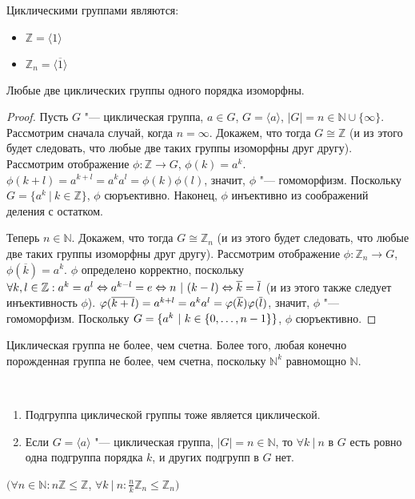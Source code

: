 \begin{example}
	Циклическими группами являются:
	\begin{itemize}
		\item $\mathbb{Z} = \langle 1 \rangle$
		\item $\mathbb{Z}_n = \langle \overline{1} \rangle$
	\end{itemize}
\end{example}

\begin{theorem}
	Любые две циклических группы одного порядка изоморфны.
\end{theorem}

\begin{proof}
	Пусть $G$ "--- циклическая группа, $a \in G$, $G = \langle a\rangle$, $|G| = n \in \mathbb{N}\cup\{\infty\}$. Рассмотрим сначала случай, когда $n = \infty$. Докажем, что тогда $G \cong \mathbb{Z}$ (и из этого будет следовать, что любые две таких группы изоморфны друг другу). Рассмотрим отображение $\phi: \mathbb{Z} \rightarrow G$, $\phi(k) = a^k$. $\phi(k + l) = a^{k + l} = a^ka^l = \phi(k)\phi(l)$, значит, $\phi$ "--- гомоморфизм. Поскольку $G = \{a^k~|~k \in \mathbb{Z}\}$, $\phi$ сюръективно. Наконец, $\phi$ инъективно из соображений деления с остатком.
	
	Теперь $n \in \mathbb{N}$. Докажем, что тогда $G \cong \mathbb{Z}_n$ (и из этого будет следовать, что любые две таких группы изоморфны друг другу). Рассмотрим отображение $\phi: \mathbb{Z}_n \rightarrow G$, $\phi(\overline{k}) = a^k$. $\phi$ определено корректно, поскольку $\forall k, l \in \mathbb{Z}: a^k = a^l \Leftrightarrow a^{k - l} = e \Leftrightarrow n~|~(k - l) \hm{\Leftrightarrow} \overline{k} = \overline{l}$ (и из этого также следует инъективность $\phi$). $\phi(\overline{k + l}) \hm{=} a^{k + l} = a^ka^l = \phi(\overline{k})\phi(\overline{l})$, значит, $\phi$ "--- гомоморфизм. Поскольку $G \hm{=} \{a^k~|~k \in \{0, \dots, n - 1\}\}$, $\phi$ сюръективно.
\end{proof}

\begin{note}
	Циклическая группа не более, чем счетна. Более того, любая конечно порожденная группа не более, чем счетна, поскольку $\mathbb{N}^k$ равномощно $\mathbb{N}$.
\end{note}

\begin{theorem}~
	\begin{enumerate}
		\item Подгруппа циклической группы тоже является циклической.
		\item Если $G = \langle a \rangle$ "--- циклическая группа, $|G| = n \in \mathbb{N}$, то $\forall k~|~n$ в $G$ есть ровно одна подгруппа порядка $k$, и других подгрупп в $G$ нет.
	\end{enumerate}
	
	$(\forall n \in \mathbb{N}: n\mathbb{Z} \le \mathbb{Z}$, $\forall k~|~n: \frac{n}{k}\mathbb{Z}_n \le \mathbb{Z}_n)$
\end{theorem}

